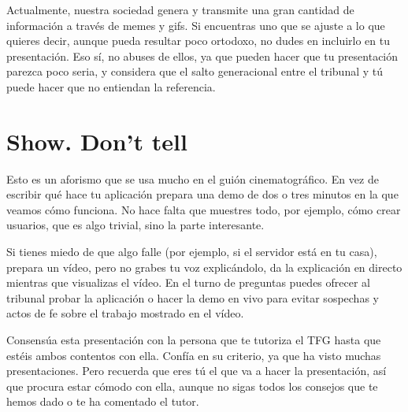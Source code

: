 
Actualmente, nuestra sociedad genera y transmite una gran cantidad de información a través de memes y gifs. Si encuentras uno que se ajuste a lo que quieres decir, aunque pueda resultar poco ortodoxo, no dudes en incluirlo en tu presentación. Eso sí, no abuses de ellos, ya que pueden hacer que tu presentación parezca poco seria, y considera que el salto generacional entre el tribunal y tú puede hacer que no entiendan la referencia. 

\section{Show. Don't tell}

Esto es un aforismo que se usa mucho en el guión cinematográfico. En vez de escribir qué hace tu aplicación prepara una demo de dos o tres minutos en la que veamos cómo funciona. No hace falta que muestres todo, por ejemplo, cómo crear usuarios, que es algo trivial, sino la parte interesante.

Si tienes miedo de que algo falle (por ejemplo, si el servidor está en tu casa), prepara un vídeo, pero no grabes tu voz explicándolo, da la explicación en directo mientras que visualizas el vídeo. En el turno de preguntas puedes ofrecer al tribunal probar la aplicación o hacer la demo en vivo para evitar sospechas y actos de fe sobre el trabajo mostrado en el vídeo.

Consensúa esta presentación con la persona que te tutoriza el TFG hasta que estéis ambos contentos con ella. Confía en su criterio, ya que ha visto muchas presentaciones. Pero recuerda que eres tú el que va a hacer la presentación, así que procura estar cómodo con ella, aunque no sigas todos los consejos que te hemos dado o te ha comentado el tutor.


